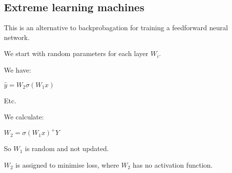 
\subsection{Extreme learning machines}

This is an alternative to backprobagation for training a feedforward neural network.

We start with random parameters for each layer \(W_i\).

We have:

\(\hat y=W_2\sigma (W_1 x)\)

Etc.

We calculate:

\(W_2=\sigma(W_1x)^+Y\)

So \(W_1\) is random and not updated.

\(W_2\) is assigned to minimise loss, where \(W_2\) has no activation function.

